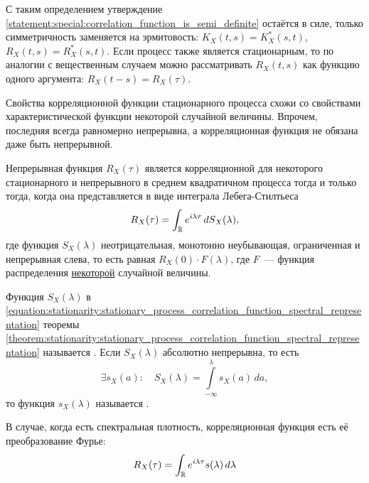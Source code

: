 С таким определением утверждение \ref{statement:special:correlation_function_is_semi_definite} остаётся в силе,
только симметричность заменяется на эрмитовость: $ K_X(t,s) = K_X^*(s,t) $, $ R_X(t,s) = R_X^*(s,t) $.
Если процесс также является стационарным,
то по аналогии с вещественным случаем можно рассматривать $ R_X(t, s) $ как функцию одного аргумента: $ R_X(t - s) = R_X(\tau) $.

Свойства корреляционной функции стационарного процесса схожи
со свойствами характеристической функции некоторой случайной величины.
Впрочем, последняя всегда равномерно непрерывна,
а корреляционная функция не обязана даже быть непрерывной.

\begin{theorem}
    \label{theorem:stationarity:stationary_process_correlation_function_spectral_representation}
    Непрерывная функция $ R_X(\tau) $ является корреляционной
    для некоторого стационарного и непрерывного в среднем квадратичном процесса тогда и только тогда,
    когда она представляется в виде интеграла Лебега-Стилтьеса
    \begin{equation}
        \label{equation:stationarity:stationary_process_correlation_function_spectral_representation}
        R_X(\tau) = \int_{\mathbb{R}} e^{i \lambda \tau} \, dS_X(\lambda),
    \end{equation}
    где функция $ S_X(\lambda) $ неотрицательная, монотонно неубывающая, ограниченная и непрерывная слева,
    то есть равная $ R_X(0) \cdot F(\lambda) $,
    где $ F $~--- функция распределения \uline{некоторой} случайной величины.
\end{theorem}

\begin{definition}
    \label{definition:stationarity:spectral_function}
    Функция $ S_X(\lambda) $ в \eqref{equation:stationarity:stationary_process_correlation_function_spectral_representation}
    теоремы \ref{theorem:stationarity:stationary_process_correlation_function_spectral_representation}
    называется .
    Если $ S_X(\lambda) $ абсолютно непрерывна, то есть
    \[
        \exists s_X(a): \quad S_X(\lambda) = \int\limits_{-\infty}^\lambda s_X(a) \, da,
    \]
    то функция $ s_X(\lambda) $ называется .
\end{definition}

\begin{remark}
    \label{remark:stationarity:spectral_density_Fourier}
    В случае, когда есть спектральная плотность, корреляционная функция есть её преобразование Фурье:
    \[
        R_X(\tau) = \int_{\mathbb{R}} e^{i \lambda \tau} s(\lambda) \, d \lambda
    \]
\end{remark}

